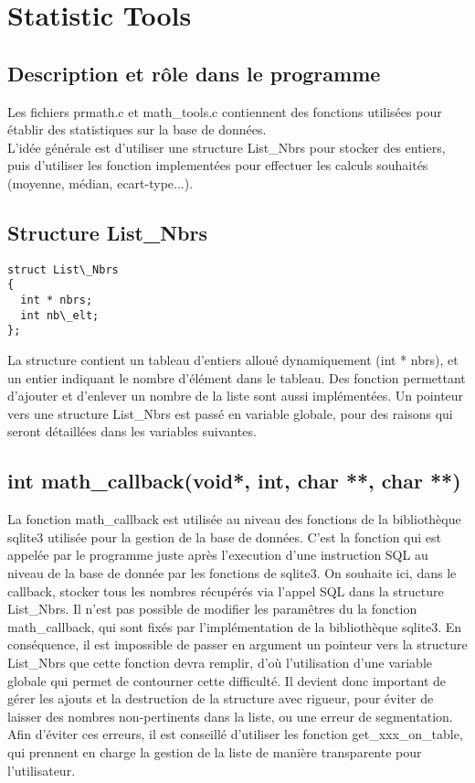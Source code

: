 \section{Statistic Tools} 

\subsection{Description et rôle dans le programme}
Les fichiers prmath.c et math\_tools.c contiennent des fonctions utilisées pour établir des statistiques sur la base de données.\\
L'idée générale est d'utiliser une structure List\_Nbrs pour stocker des entiers, puis d'utiliser les fonction implementées pour effectuer les calculs souhaités (moyenne, médian, ecart-type...).
\subsection*{Structure List\_Nbrs}
\begin{verbatim}
struct List\_Nbrs
{
  int * nbrs;
  int nb\_elt;
};
\end{verbatim}
La structure contient un tableau d'entiers alloué dynamiquement (int * nbrs), et un entier indiquant le nombre d'élément dans le tableau. Des fonction permettant d'ajouter et d'enlever un nombre de la liste sont aussi implémentées. Un pointeur vers une structure List\_Nbrs est passé en variable globale, pour des raisons qui seront détaillées dans les variables suivantes.
\subsection*{int math\_callback(void*, int, char **, char **)}
La fonction math\_callback est utilisée au niveau des fonctions de la bibliothèque sqlite3 utilisée pour la gestion de la base de données. C'est la fonction qui est appelée par le programme juste après l'execution d'une instruction SQL au niveau de la base de donnée par les fonctions de sqlite3. On souhaite ici, dans le callback, stocker tous les nombres récupérés via l'appel SQL dans la structure List\_Nbrs. Il n'est pas possible de modifier les paramêtres du la fonction math\_callback, qui sont fixés par l'implémentation de la bibliothèque sqlite3. En conséquence, il est impossible de passer en argument un pointeur vers la structure List\_Nbrs que cette fonction devra remplir, d'où l'utilisation d'une variable globale qui permet de contourner cette difficulté. Il devient donc important de gérer les ajouts et la destruction de la structure avec rigueur, pour éviter de laisser des nombres non-pertinents dans la liste, ou une erreur de segmentation. Afin d'éviter ces erreurs, il est conseillé d'utiliser les fonction get\_xxx\_on\_table, qui prennent en charge la gestion de la liste de manière transparente pour l'utilisateur.
